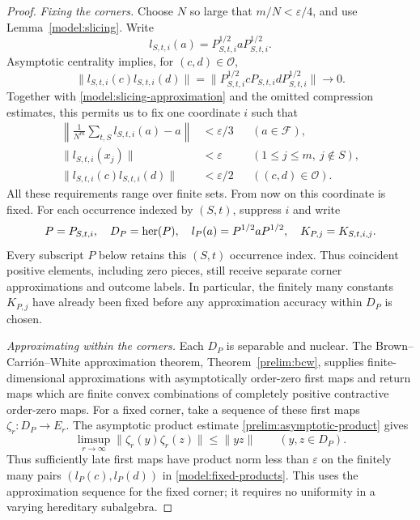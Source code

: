 \begin{proof}
\emph{Fixing the corners.}
Choose $N$ so large that $m/N<\varepsilon/4$, and use
Lemma~\ref{model:slicing}.  Write
\[
 l_{S,t,i}(a)=P_{S,t,i}^{1/2}aP_{S,t,i}^{1/2}.
\]
Asymptotic centrality implies, for $(c,d)\in\mathcal O$,
\[
 \|l_{S,t,i}(c)l_{S,t,i}(d)\|
 =\|P_{S,t,i}^{1/2}cP_{S,t,i}dP_{S,t,i}^{1/2}\|
 \longrightarrow0.
\]
Together with \eqref{model:slicing-approximation} and the omitted
compression estimates, this permits us to fix one coordinate $i$
such that
\begin{align}
 \left\|\frac1{N^m}\sum_{t,S}l_{S,t,i}(a)-a\right\|
   &<\varepsilon/3 &&(a\in\mathcal F),
       \label{model:fixed-average}\\
 \|l_{S,t,i}(x_j)\|&<\varepsilon
       &&(1\leq j\leq m,\ j\notin S), \label{model:fixed-omitted}\\
 \|l_{S,t,i}(c)l_{S,t,i}(d)\|&<\varepsilon/2
       &&((c,d)\in\mathcal O). \label{model:fixed-products}
\end{align}
All these requirements range over finite sets.  From now on this
coordinate is fixed.  For each occurrence indexed by $(S,t)$,
suppress $i$ and write
\[
 P=P_{S,t,i},\quad D_P=\operatorname{her}(P),\quad
 l_P(a)=P^{1/2}aP^{1/2},\quad K_{P,j}=K_{S,t,i,j}.
\]
Every subscript $P$ below retains this $(S,t)$ occurrence index.
Thus coincident positive elements, including zero pieces, still
receive separate corner approximations and outcome labels.
In particular, the finitely many constants $K_{P,j}$ have already
been fixed before any approximation accuracy within $D_P$ is
chosen.

\emph{Approximating within the corners.}
Each $D_P$ is separable and nuclear.  The Brown--Carri\'on--White
approximation theorem, Theorem~\ref{prelim:bcw}, supplies
finite-dimensional approximations with asymptotically order-zero
first maps and return maps which are finite convex combinations
of completely positive contractive order-zero maps.
For a fixed corner, take a sequence of these first maps
$\zeta_r\colon D_P\to E_r$. The asymptotic product estimate
\eqref{prelim:asymptotic-product} gives
\begin{equation}
 \label{model:quotient-product-bound}
 \limsup_{r\to\infty}\|\zeta_r(y)\zeta_r(z)\|
   \leq\|yz\|\qquad(y,z\in D_P).
\end{equation}
Thus sufficiently late first maps have product norm less than
$\varepsilon$ on the finitely many pairs
$(l_P(c),l_P(d))$ in \eqref{model:fixed-products}.  This uses the
approximation sequence for the fixed corner; it requires no
uniformity in a varying hereditary subalgebra.


\end{proof}
